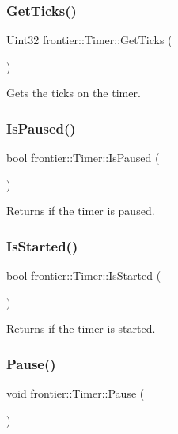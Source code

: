 \subsubsection{\texorpdfstring{Get\+Ticks()}{GetTicks()}}
{\footnotesize\ttfamily Uint32 frontier\+::\+Timer\+::\+Get\+Ticks (\begin{DoxyParamCaption}{ }\end{DoxyParamCaption})}



Gets the ticks on the timer. 

\mbox{\label{classfrontier_1_1_timer_ab1436c1f41e9226977fc8500b6fe3b41}} 
\subsubsection{\texorpdfstring{Is\+Paused()}{IsPaused()}}
{\footnotesize\ttfamily bool frontier\+::\+Timer\+::\+Is\+Paused (\begin{DoxyParamCaption}{ }\end{DoxyParamCaption})}



Returns if the timer is paused. 

\mbox{\label{classfrontier_1_1_timer_a955bac73463eb53813b84c945f0b9327}} 
\subsubsection{\texorpdfstring{Is\+Started()}{IsStarted()}}
{\footnotesize\ttfamily bool frontier\+::\+Timer\+::\+Is\+Started (\begin{DoxyParamCaption}{ }\end{DoxyParamCaption})}



Returns if the timer is started. 

\mbox{\label{classfrontier_1_1_timer_a9d4c0d3d515cea7b5784ca7488b01d79}} 
\subsubsection{\texorpdfstring{Pause()}{Pause()}}
{\footnotesize\ttfamily void frontier\+::\+Timer\+::\+Pause (\begin{DoxyParamCaption}{ }\end{DoxyParamCaption})}



